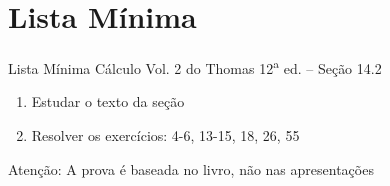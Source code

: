 \section{Lista Mínima}

\begin{frame}{Lista Mínima}
  Cálculo Vol. 2 do Thomas 12\textsuperscript{a} ed. -- Seção 14.2
  \begin{enumerate}
    \item Estudar o texto da seção
    \item Resolver os exercícios: 4-6, 13-15, 18, 26, 55
  \end{enumerate}

  \vfill
  Atenção: A prova é baseada no livro, não nas apresentações
\end{frame}


